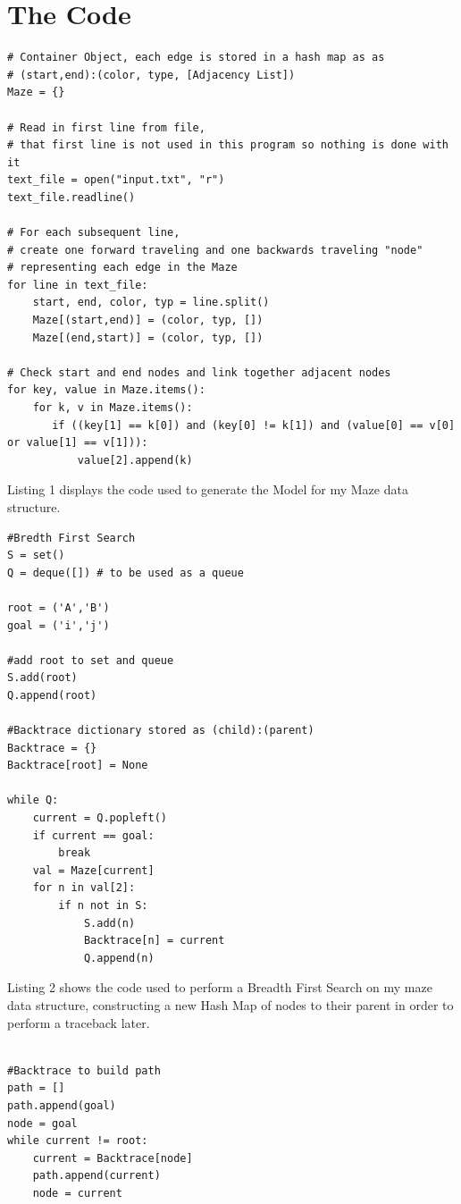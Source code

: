 \documentclass[12pt]{article}
\begin{document}
\section{The Code}
\linespread{1}
\begin{lstlisting}[caption= Maze Model]
# Container Object, each edge is stored in a hash map as as 
# (start,end):(color, type, [Adjacency List])
Maze = {}

# Read in first line from file,
# that first line is not used in this program so nothing is done with it
text_file = open("input.txt", "r")
text_file.readline()

# For each subsequent line, 
# create one forward traveling and one backwards traveling "node" 
# representing each edge in the Maze
for line in text_file:
    start, end, color, typ = line.split()
    Maze[(start,end)] = (color, typ, [])
    Maze[(end,start)] = (color, typ, [])

# Check start and end nodes and link together adjacent nodes
for key, value in Maze.items():
    for k, v in Maze.items():
       if ((key[1] == k[0]) and (key[0] != k[1]) and (value[0] == v[0] or value[1] == v[1])):
           value[2].append(k)

\end{lstlisting}

Listing 1 displays the code used to generate the Model for my Maze data structure. 

\begin{lstlisting}[caption=BFS]
#Bredth First Search
S = set()
Q = deque([]) # to be used as a queue

root = ('A','B')
goal = ('i','j')

#add root to set and queue
S.add(root)
Q.append(root)

#Backtrace dictionary stored as (child):(parent)
Backtrace = {}
Backtrace[root] = None

while Q:
    current = Q.popleft()
    if current == goal:
        break
    val = Maze[current]
    for n in val[2]:
        if n not in S:
            S.add(n)
            Backtrace[n] = current
            Q.append(n)
\end{lstlisting}

Listing 2 shows the code used to perform a Breadth First Search on my maze data structure, constructing a new Hash Map of nodes to their parent in order to perform a traceback later.

\newpage

\begin{lstlisting}[caption=Traceback]

#Backtrace to build path
path = []
path.append(goal)
node = goal
while current != root:
    current = Backtrace[node]
    path.append(current)
    node = current

\end{lstlisting}
\end{document}
